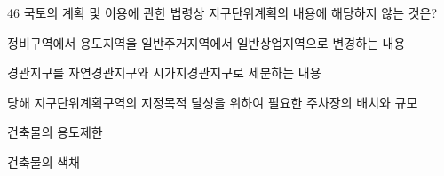\begin{question}{46}
국토의 계획 및 이용에 관한 법령상 지구단위계획의 내용에 해당하지 않는 것은?
\begin{choices}
  \item 정비구역에서 용도지역을 일반주거지역에서 일반상업지역으로 변경하는 내용
  \item 경관지구를 자연경관지구와 시가지경관지구로 세분하는 내용
  \item 당해 지구단위계획구역의 지정목적 달성을 위하여 필요한 주차장의 배치와 규모
  \item 건축물의 용도제한
  \item 건축물의 색채
\end{choices}
\end{question}
